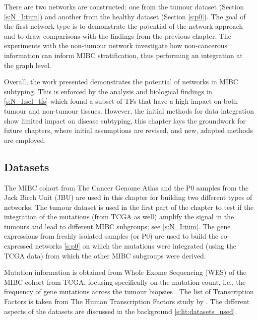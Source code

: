 There are two networks are constructed: one from the tumour dataset (Section \ref{s:N_I:tum}) and another from the healthy dataset (Section \ref{s:p0}). The goal of the first network type is to demonstrate the potential of the network approach and to draw comparisons with the findings from the previous chapter. The experiments with the non-tumour network investigate how non-cancerous information can inform MIBC stratification, thus performing an integration at the graph level.

Overall, the work presented demonstrates the potential of networks in MIBC subtyping. This is enforced by the analysis and biological findings in \cref{s:N_I:sel_tfs} which found a subset of TFs that have a high impact on both tumour and non-tumour tissues. However, the initial methods for data integration show limited impact on disease subtyping, this chapter lays the groundwork for future chapters, where initial assumptions are revised, and new, adapted methods are employed.



\subsection*{Datasets}

The MIBC cohort from The Cancer Genome Atlas \citep{Tcga2018-sj} and the P0 samples from the Jack Birch Unit (JBU) are used in this chapter for building two different types of networks. The tumour dataset is used in the first part of the chapter to test if the integration of the mutations (from TCGA as well) amplify the signal in the tumours and lead to different MIBC subgroups; see \cref{s:N_I:tum}. The gene expressions from freshly isolated samples (or P0) are used to build the co-expressed networks \cref{s:p0} on which the mutations were integrated (using the TCGA data) from which the other MIBC subgroups were derived.

Mutation information is obtained from Whole Exome Sequencing (WES) of the MIBC cohort from TCGA, focusing specifically on the mutation count, i.e., the frequency of gene mutations across the tumour biopsies . The list of Transcription Factors is taken from The Human Transcription Factors study by \citet{Lambert2018-el}. The different aspects of the datasets are discussed in the background \cref{s:lit:datasets_used}.




